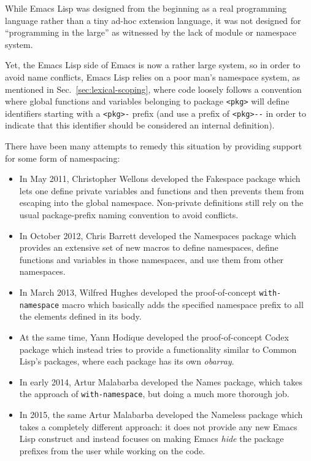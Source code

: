 \documentclass[format=acmsmall, review]{acmart}
\newcommand \Elisp {Emacs Lisp}
\begin{document}
While \Elisp{} was designed from the beginning as a real programming
language rather than a tiny ad-hoc extension language, it was not designed
for ``programming in the large'' as witnessed by the lack of module or
namespace system.

Yet, the \Elisp{} side of Emacs is now a rather large system, so in order to
avoid name conflicts, \Elisp{} relies on a poor man's namespace system, as
mentioned in Sec.~\ref{sec:lexical-scoping}, where code loosely follows
a convention where global functions and variables belonging to package
\verb|<pkg>| will define identifiers starting with a \verb|<pkg>-|
prefix (and use a prefix of \verb|<pkg>--| in order to indicate that this
identifier should be considered an internal definition).

There have been many attempts to remedy this situation by providing support
for some form of namespacing:
\begin{itemize}
\item In May 2011, Christopher Wellons developed the Fakespace package which
  lets one define private variables and functions and then prevents them
  from escaping into the global namespace.  Non-private definitions still
  rely on the usual package-prefix naming convention to avoid conflicts.
\item In October 2012, Chris Barrett developed the Namespaces package which
  provides an extensive set of new macros to define namespaces, define
  functions and variables in those namespaces, and use them from
  other namespaces.
\item In March 2013, Wilfred Hughes developed the proof-of-concept
  \texttt{with-namespace} macro which basically adds the specified namespace
  prefix to all the elements defined in its body.
\item At the same time, Yann Hodique developed the proof-of-concept Codex
  package which instead tries to provide a functionality similar to
  Common Lisp's packages, where each package has its own \emph{obarray}.
\item In early 2014, Artur Malabarba developed the Names package, which
  takes the approach of \texttt{with-namespace}, but doing a much more
  thorough job.
\item In 2015, the same Artur Malabarba developed the Nameless package which
  takes a completely different approach: it does not provide any new
  \Elisp{} construct and instead focuses on making Emacs \emph{hide} the
  package prefixes from the user while working on the code.
\end{itemize}
\end{document}

